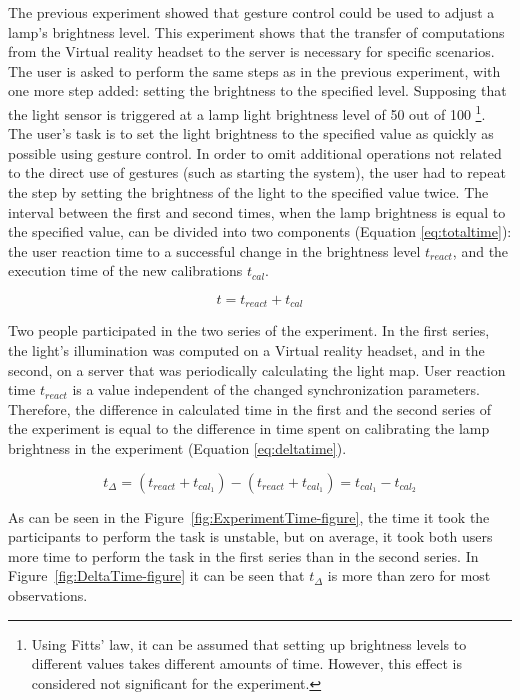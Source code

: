 The previous experiment showed that gesture control could be used to adjust a lamp's brightness level. This experiment shows that the transfer of computations from the Virtual reality headset to the server is necessary for specific scenarios. The user is asked to perform the same steps as in the previous experiment, with one more step added:  setting the brightness to the specified level. Supposing that the light sensor is triggered at a lamp light brightness level of 50 out of 100 \footnote{Using Fitts' law, it can be assumed that setting up brightness levels to different values takes different amounts of time. However, this effect is considered not significant for the experiment.}. The user's task is to set the light brightness to the specified value as quickly as possible using gesture control. In order to omit additional operations not related to the direct use of gestures (such as starting the system), the user had to repeat the step by setting the brightness of the light to the specified value twice. The interval between the first and second times, when the lamp brightness is equal to the specified value, can be divided into two components (Equation \eqref{eq:totaltime}): the user reaction time to a successful change in the brightness level $ t_{react} $, and the execution time of the new calibrations $ t_{cal} $.


\begin{equation}
  t = t_{react} + t_{cal}
  \label{eq:totaltime}
\end{equation}

Two people participated in the two series of the experiment. In the first series, the light's illumination was computed on a Virtual reality headset, and in the second, on a server that was periodically calculating the light map. User reaction time $ t_{react} $ is a value independent of the changed synchronization parameters. Therefore, the difference in calculated time in the first and the second series of the experiment is equal to the difference in time spent on calibrating the lamp brightness in the experiment (Equation \eqref{eq:deltatime}).

\begin{equation}
  t _{\Delta} = (t_{react} + t_{cal_1}) - (t_{react} + t_{cal_1}) = t_{cal_1} - t_{cal_2}
  \label{eq:deltatime}
\end{equation}

As can be seen in the Figure~\ref{fig:ExperimentTime-figure}, the time it took the participants to perform the task is unstable, but on average, it took both users more time to perform the task in the first series than in the second series. In Figure~\ref{fig:DeltaTime-figure} it can be seen that $t_{\Delta}$ is more than zero for most observations.

